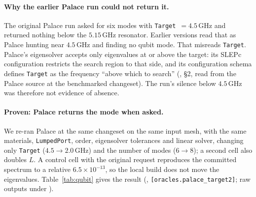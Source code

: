 \documentclass{anvil-paper}
\begin{document}
\paragraph{Why the earlier Palace run could not return it.}
The original Palace run asked for six modes with
\texttt{Target}~$= 4.5$\,GHz and returned nothing below the $5.15$\,GHz
resonator. Earlier versions read that as Palace hunting near
$4.5$\,GHz and finding no qubit mode. That misreads \texttt{Target}.
Palace's eigensolver accepts only eigenvalues at or above the target: its
SLEPc configuration restricts the search region to that side, and its
configuration schema defines \texttt{Target} as the frequency ``above
which to search''
(, \S2, read
from the Palace source at the benchmarked changeset). The run's silence
below $4.5$\,GHz was therefore not evidence of absence.

\paragraph{Proven: Palace returns the mode when asked.}
We re-ran Palace at the same changeset on the same input mesh, with the
same materials, \texttt{LumpedPort}, order, eigensolver tolerances and
linear solver, changing only \texttt{Target} ($4.5 \to 2.0$\,GHz) and the
number of modes ($6 \to 8$); a second cell also doubles $L$. A control
cell with the original request reproduces the committed spectrum to a
relative $6.5\times10^{-13}$, so the local build does not move the
eigenvalues. Table~\ref{tab:qubit} gives the result
(,
\texttt{[oracles.palace\_target2]}; raw outputs under
).
\end{document}

